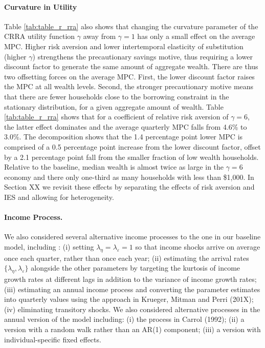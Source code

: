 \paragraph{Curvature in Utility}
Table \ref{tab:table_r_rra} also shows that changing the curvature parameter of the CRRA utility function $\gamma$ away from $\gamma=1$ has only a small effect on the average MPC. Higher risk aversion and lower intertemporal elasticity of substitution (higher $\gamma$) strengthens the precautionary savings motive, thus requiring a lower discount factor to generate the same amount of aggregate wealth. There are thus two offsetting forces on the average MPC. First, the lower discount factor raises the MPC at all wealth levels. Second, the stronger precautionary motive means that there are fewer households close to the borrowing constraint in the stationary distribution, for a given aggregate amount of wealth. Table \ref{tab:table_r_rra} shows that for a  coefficient of relative risk aversion of $\gamma=6$, the latter effect dominates and the average quarterly MPC falls from 4.6\% to 3.0\%. The decomposition shows that the 1.4 percentage point lower MPC is comprised of a 0.5 percentage point increase from the lower discount factor, offset by a 2.1 percentage point fall from the smaller fraction of low wealth households. Relative to the baseline, median wealth is almost twice as large in the $\gamma=6$ economy and there only one-third as many households with less than \$1,000. In Section XX we revisit these effects by separating the effects of risk aversion and IES and allowing for heterogeneity.


\paragraph{Income Process.}

We also considered several alternative income processes to the one in our baseline model, including : (i) setting $\lambda_{\eta}=\lambda_{\varepsilon}=1$ so that income shocks arrive on average once each quarter, rather than once each year; (ii) estimating the arrival rates $\{\lambda_{\eta}, \lambda_{\varepsilon}\}$ alongside the other parameters by targeting the kurtosis of income growth rates at different lags in addition to the variance of income growth rates; (iii) estimating an annual income process and converting the parameter estimates into quarterly values using the approach in Krueger, Mitman and Perri (201X); (iv) eliminating transitory shocks. We also considered alternative processes in the annual version of the model including: (i) the process in Carrol (1992); (ii) a version with a random walk rather than an AR(1) component; (iii) a version with individual-specific fixed effects.

